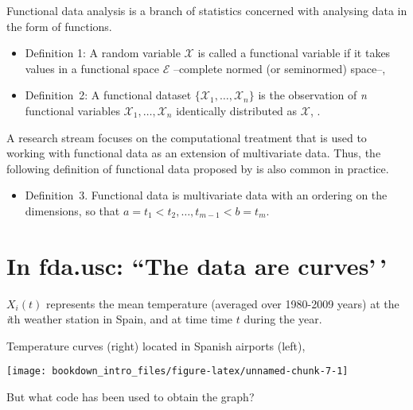 \documentclass[
]{book}
\providecommand{\tightlist}{%
  \setlength{\itemsep}{0pt}\setlength{\parskip}{0pt}}
\begin{document}
Functional data analysis is a branch of statistics concerned with analysing data in the form of functions.

\begin{itemize}
\item
  Definition 1: A random variable \(\mathcal{X}\) is called a functional variable if it takes values in a functional space \(\mathcal{E}\) --complete normed (or seminormed) space--, \citep{FV2006}
\item
  Definition~2: A functional dataset \(\{\mathcal{X}_1,\ldots,\mathcal{X}_n\}\) is the observation of \emph{n} functional variables \(\mathcal{X}_1,\ldots,\mathcal{X}_n\) identically distributed as \(\mathcal{X}\), \citep{FV2006}.
\end{itemize}

A research stream focuses on the computational treatment that is used to working with functional data as an extension of multivariate data. Thus, the following definition of functional data proposed by \citep{mu2008functional} is also common in practice.

\begin{itemize}
\tightlist
\item
  Definition~3. Functional data is multivariate data with an ordering on the dimensions, so that \(a=t_1<t_2,\ldots,t_{m-1}< b=t_m\).
\end{itemize}

\hypertarget{in-fda.usc-the-data-are-curves}{%
\section{In fda.usc: ``The data are curves'\,'}\label{in-fda.usc-the-data-are-curves}}

\(X_i(t)\) represents the mean temperature (averaged over 1980-2009 years) at the \emph{i}th weather station in Spain, and at time time \(t\) during the year.

Temperature curves (right) located in Spanish airports (left),

\begin{center}\texttt{[image: bookdown\_intro\_files/figure-latex/unnamed-chunk-7-1]} \end{center}

But what code has been used to obtain the graph?
\end{document}
